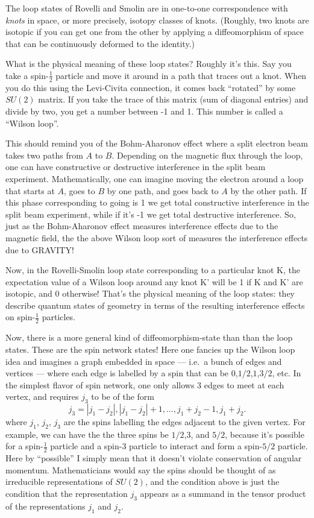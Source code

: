 \documentclass{article}
\begin{document}
The loop states of Rovelli and Smolin are in one-to-one correspondence
with \emph{knots} in space, or more precisely, isotopy classes of knots.
(Roughly, two knots are isotopic if you can get one from the other by
applying a diffeomorphism of space that can be continuously deformed to
the identity.)

What is the physical meaning of these loop states? Roughly it's this.
Say you take a spin-\(\frac12\) particle and move it around in a path
that traces out a knot. When you do this using the Levi-Civita
connection, it comes back ``rotated'' by some \(SU(2)\) matrix. If you
take the trace of this matrix (sum of diagonal entries) and divide by
two, you get a number between -1 and 1. This number is called a ``Wilson
loop''.

This should remind you of the Bohm-Aharonov effect where a split
electron beam takes two paths from \(A\) to \(B\). Depending on the
magnetic flux through the loop, one can have constructive or destructive
interference in the split beam experiment. Mathematically, one can
imagine moving the electron around a loop that starts at \(A\), goes to
\(B\) by one path, and goes back to \(A\) by the other path. If this
phase corresponding to going is 1 we get total constructive interference
in the split beam experiment, while if it's -1 we get total destructive
interference. So, just as the Bohm-Aharonov effect measures interference
effects due to the magnetic field, the the above Wilson loop sort of
measures the interference effects due to GRAVITY!

Now, in the Rovelli-Smolin loop state corresponding to a particular knot
K, the expectation value of a Wilson loop around any knot K' will be 1
if K and K' are isotopic, and 0 otherwise! That's the physical meaning
of the loop states: they describe quantum states of geometry in terms of
the resulting interference effects on spin-\(\frac12\) particles.

Now, there is a more general kind of diffeomorphism-state than than the
loop states. These are the spin network states! Here one fancies up the
Wilson loop idea and imagines a graph embedded in space --- i.e.~a bunch
of edges and vertices --- where each edge is labelled by a spin that can
be \(0\),\(1/2\),\(1\),\(3/2\), etc. In the simplest flavor of spin
network, one only allows 3 edges to meet at each vertex, and requires
\(j_3\) to be of the form
\[j_3 = |j_1-j_2|, |j_1-j_2| + 1, \ldots, j_1+j_2-1, j_1+j_2.\] where
\(j_1\), \(j_2\), \(j_3\) are the spins labelling the edges adjacent to
the given vertex. For example, we can have the the three spins be
\(1/2\),\(3\), and \(5/2\), because it's possible for a spin-\(\frac12\)
particle and a spin-3 particle to interact and form a spin-\(5/2\)
particle. Here by ``possible'' I simply mean that it doesn't violate
conservation of angular momentum. Mathematicians would say the spins
should be thought of as irreducible representations of \(SU(2)\), and
the condition above is just the condition that the representation
\(j_3\) appears as a summand in the tensor product of the
representations \(j_1\) and \(j_2\).
\end{document}
